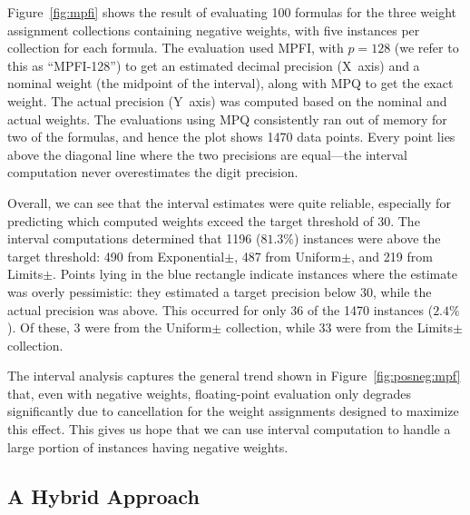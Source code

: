 \documentclass[
hf
]{ceurart}
\begin{document}
Figure~\ref{fig:mpfi} shows the result of evaluating 100 formulas for
the three weight assignment collections containing negative weights,
with five instances per collection for each formula.  
The evaluation used
MPFI, with $p=128$ (we refer to this as ``MPFI-128'') to get an estimated decimal precision (X~axis) and
a nominal weight (the midpoint of the interval), along with MPQ to get
the exact weight.  The actual precision (Y~axis) was computed based on the
nominal and actual weights.  The evaluations using MPQ consistently ran out of
memory for two of the formulas, and hence the plot shows 1470
data points.  
Every point lies above the diagonal line where the two precisions are equal---the interval computation never overestimates the digit
precision.

Overall, we can see that the interval estimates were quite reliable,
especially for predicting which computed weights exceed the target
threshold of 30.
The
interval computations determined that 1196 ($81.3\%$) instances were
above the target threshold: 490 from \textsf{Exponential$\pm$}, 487 from
\textsf{Uniform$\pm$}, and 219 from \textsf{Limits$\pm$}.
Points lying in the blue rectangle
indicate instances where the estimate was overly pessimistic: they
estimated a target precision below 30, while the actual precision was
above.  This occurred for only 36 of the 1470 instances ($2.4\%$).  Of
these, 3 were from the \textsf{Uniform$\pm$} collection, while 33 were
from the \textsf{Limits$\pm$} collection.  

The interval analysis captures the general trend shown in
Figure~\ref{fig:posneg:mpf} that, even with negative
weights, floating-point evaluation only degrades significantly due to cancellation
for the weight assignments designed to maximize
this effect.  This gives us hope that we can use interval computation
to handle a large portion of instances having negative weights.

\subsection{A Hybrid Approach}
\label{sect:hybrid}

\begin{table}
  \caption{Performance Comparison of Different Implementation Strategies.  Run entries of the form $S$+$F$ indicate that $S$ runs
  were successful and $F$ runs either ran out of memory or failed to meet the target precision.  Our hybrid strategy is shown in red.}
  \label{tab:compare}
\end{table}
\end{document}
